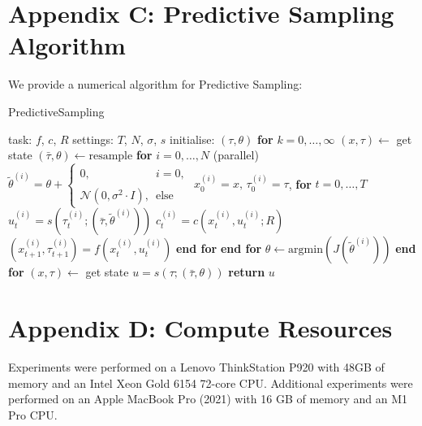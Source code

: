 \section{Appendix C: Predictive Sampling Algorithm}
We provide a numerical algorithm for Predictive Sampling:

\begin{algorithm}[H]
	\caption{PredictiveSampling}\label{predictive_sampling_algorithm_numeric}
	\begin{algorithmic}[1]
		\State task: $f$, $c$, $R$
		\State settings: $T$, $N$, $\sigma$, $s$
		\State initialise: $(\tau, \theta)$
		\State \textbf{for} $k = 0, \dots, \infty$
		\State \indent $(x, \tau) \leftarrow$ get state
		\State \indent $(\bar{\tau}, \theta) \leftarrow \text{resample}$
		\State \indent \textbf{for} $i = 0, \dots, N$ (parallel)
		\State \indent \indent $\tilde{\theta}^{(i)} = \theta + 
		\begin{cases}
			0, \phantom{\mathcal{N}(0, \sigma^2 \cdot I)} i = 0, \\ 
			\mathcal{N}(0, \sigma^2 \cdot I), \phantom{0} \text{else} 
		\end{cases}$
		\State \indent \indent $x^{(i)}_0 = x, \, \tau_0^{(i)} = \tau$,
		\State \indent \indent \textbf{for} $t = 0, \dots, T$
		\State \indent \indent \indent $u^{(i)}_{t} = s(\tau^{(i)}_t; (\bar{\tau}, \tilde{\theta}^{(i)}))$
		\State \indent \indent \indent $c^{(i)}_{t} = c(x^{(i)}_t, u^{(i)}_t; R)$
		\State \indent \indent \indent $(x^{(i)}_{t+1}, \tau^{(i)}_{t+1}) = f(x^{(i)}_t, u^{(i)}_t)$
		\State \indent \indent \textbf{end for}
		\State \indent \textbf{end for} 
		\State \indent $\theta \leftarrow \text{argmin}\left(J(\tilde{\theta}^{(i)})\right)$
		\State \textbf{end for}
		\EndProcedure
		\State $(x, \tau) \leftarrow$ get state
		\State $u = s(\tau; (\bar{\tau}, \theta))$
		\State \textbf{return} $u$
		\EndProcedure
	\end{algorithmic}
\end{algorithm}

\section{Appendix D: Compute Resources}
Experiments were performed on a Lenovo ThinkStation P920 with 48GB of memory and an Intel Xeon Gold 6154 72-core CPU. Additional experiments were performed on an Apple MacBook Pro (2021) with 16 GB of memory and an M1 Pro CPU.

